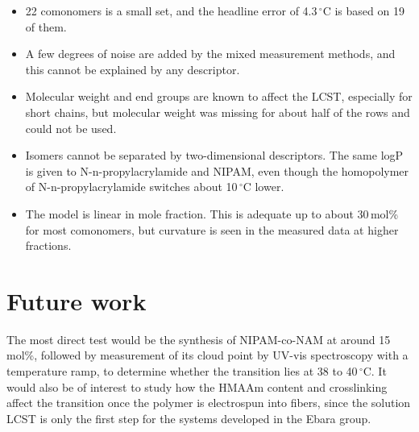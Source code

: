 \documentclass[11pt,a4paper]{article}
\newcommand{\degC}{\ensuremath{^{\circ}}C}
\begin{document}
\begin{itemize}
  \item 22 comonomers is a small set, and the headline error of 4.3\,\degC{} is based
  on 19 of them.
  \item A few degrees of noise are added by the mixed measurement methods, and this
  cannot be explained by any descriptor.
  \item Molecular weight and end groups are known to affect the LCST, especially for
  short chains, but molecular weight was missing for about half of the rows and could
  not be used.
  \item Isomers cannot be separated by two-dimensional descriptors. The same logP is
  given to N-n-propylacrylamide and NIPAM, even though the homopolymer of
  N-n-propylacrylamide switches about 10\,\degC{} lower.
  \item The model is linear in mole fraction. This is adequate up to about 30\,mol\%
  for most comonomers, but curvature is seen in the measured data at higher fractions.
\end{itemize}

\section{Future work}

The most direct test would be the synthesis of NIPAM-co-NAM at around 15\,mol\%,
followed by measurement of its cloud point by UV-vis spectroscopy with a temperature
ramp, to determine whether the transition lies at 38 to 40\,\degC. It would also be of
interest to study how the HMAAm content and crosslinking affect the transition once
the polymer is electrospun into fibers, since the solution LCST is only the first
step for the systems developed in the Ebara group.
\end{document}
